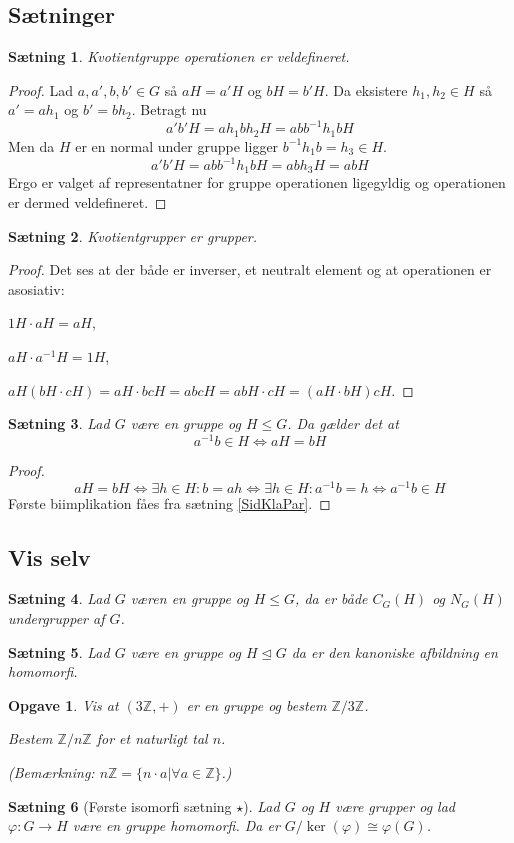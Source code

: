 \documentclass{article}
\newcommand{\Z}{\mathbb{Z}}
\newcommand{\inv}{^{-1}}
\newcommand{\biimp}{\Leftrightarrow}
\newcommand{\too}{\rightarrow}
\newtheorem{opg}{Opgave}
\newtheorem{setn}{Sætning}
\begin{document}
		\subsection*{Sætninger}
		\begin{setn}
			Kvotientgruppe operationen er veldefineret.
		\end{setn}
		\begin{proof}
			Lad $a,a',b,b' \in G$ så $aH = a'H$ og $bH = b'H$. Da eksistere $h_1, h_2 \in H$
			så $a' = ah_1$ og $b' = bh_2$. Betragt nu
			$$a'b'H = ah_1bh_2H = abb\inv h_1bH$$
			Men da $H$ er en normal under gruppe ligger $b\inv h_1 b = h_3 \in H$.
			$$a'b'H = abb\inv h_1bH = abh_3H = abH$$
			Ergo er valget af representatner for gruppe operationen ligegyldig og operationen
			er dermed veldefineret.
		\end{proof}
		\begin{setn}
			Kvotientgrupper er grupper.
		\end{setn}
		\begin{proof}
			Det ses at der både er inverser, et neutralt element og at operationen er asosiativ:

			$1H\cdot aH = aH$,

			$aH\cdot a\inv H = 1H$,

			$aH(bH\cdot cH) = aH \cdot bcH = abcH = abH \cdot cH = (aH\cdot bH)cH$.
		\end{proof}
		\begin{setn} \label{SidKlaKrav}
			Lad $G$ være en gruppe og $H \le G$. Da gælder det at 
			$$a\inv b \in H \biimp aH = bH$$
		\end{setn}
		\begin{proof}
			$$aH = bH \biimp \exists h \in H: b = ah \biimp \exists h \in H: a\inv b = h \biimp
			a\inv b \in H$$
			Første biimplikation fåes fra sætning \ref{SidKlaPar}.
		\end{proof}
		\subsection*{Vis selv}
		\begin{setn}
			Lad $G$ væren en gruppe og $H \le G$, da er både $C_G(H)$ og $N_G(H)$ undergrupper
			af $G$.
		\end{setn}
		\begin{setn}
			Lad $G$ være en gruppe og $H \unlhd G$ da er
			den kanoniske afbildning en homomorfi.
		\end{setn}
		\begin{opg}
			Vis at $(3\Z,+)$ er en gruppe og bestem $\Z/3\Z$.

			Bestem $\Z/n\Z$ for et naturligt tal $n$.

			(Bemærkning: $n\Z = \{n\cdot a| \forall a \in \Z\}$.)
		\end{opg}
		\begin{setn}[Første isomorfi sætning $\star$] \label{Iso1}
			Lad $G$ og $H$ være grupper og lad $\varphi: G \too H$ være en gruppe homomorfi.
			Da er $G/\ker(\varphi) \cong \varphi(G)$.
		\end{setn}
	\newpage
\end{document}
